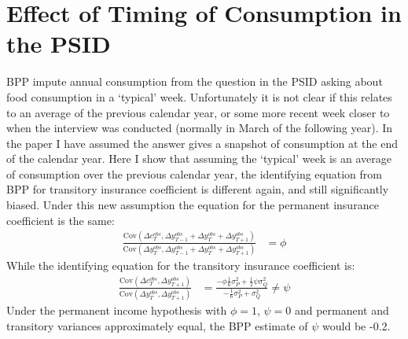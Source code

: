 \section{Effect of Timing of Consumption in the PSID} \label{typical_week}
BPP impute annual consumption from the question in the PSID asking about food consumption in a `typical' week. Unfortunately it is not clear if this relates to an average of the previous calendar year, or some more recent week closer to when the interview was conducted (normally in March of the following year). In the paper I have assumed the answer gives a snapshot of consumption at the end of the calendar year. Here I show that assuming the `typical' week is an average of consumption over the previous calendar year, the identifying equation from BPP for transitory insurance coefficient is different again, and still significantly biased. Under this new assumption the equation for the permanent insurance coefficient is the same:
\begin{align*}
\frac{\mathrm{Cov}(\Delta c^{obs}_{T}, \Delta y^{obs}_{T-1}+\Delta y^{obs}_{T}+\Delta y^{obs}_{T+1})}{\mathrm{Cov}(\Delta y^{obs}_{T}, \Delta y^{obs}_{T-1}+\Delta y^{obs}_{T}+\Delta y^{obs}_{T+1})}&= \phi
\end{align*}
While the identifying equation for the transitory insurance coefficient is:
\begin{align*}
\frac{\mathrm{Cov}(\Delta c^{obs}_{T},\Delta y^{obs}_{T+1})}{\mathrm{Cov}(\Delta y^{obs}_{T},\Delta y^{obs}_{T+1})} &= \frac{-\phi\frac{1}{6}\sigma^2_P + \frac{1}{2}\psi\sigma^2_Q}{-\frac{1}{6}\sigma^2_P + \sigma^2_Q} \neq \psi 
\end{align*}
Under the permanent income hypothesis with $\phi=1$, $\psi=0$ and permanent and transitory variances approximately equal, the BPP estimate of $\psi$ would be -0.2.